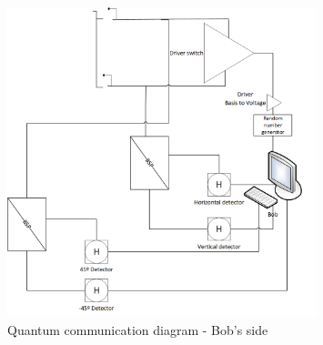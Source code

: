 \begin{figure}[H]
	\centering \includegraphics[width=0.8\textwidth,height=9cm]{./sdf/ot_with_discrete_variables/figures/OT_experimental_bob.png}
	\caption{Quantum communication diagram - Bob's side}\label{quantumchannelcommunication2}
\end{figure} 